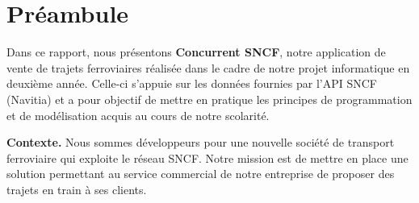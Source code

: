 \documentclass[12pt,a4paper]{report}
\begin{document}
\section*{Préambule}

Dans ce rapport, nous présentons \textbf{Concurrent SNCF}, notre
application de vente de trajets ferroviaires réalisée dans le cadre de notre
projet informatique en deuxième année. Celle-ci s'appuie sur les données
fournies par l'API SNCF (Navitia) et a pour objectif de mettre en pratique
les principes de programmation et de modélisation acquis au cours de notre
scolarité.

\vspace{0.5cm}

\noindent\textbf{Contexte.} Nous sommes développeurs pour une nouvelle
société de transport ferroviaire qui exploite le réseau SNCF. Notre mission
est de mettre en place une solution permettant au service commercial de
notre entreprise de proposer des trajets en train à ses clients.

\vspace{0.3cm}
\end{document}
